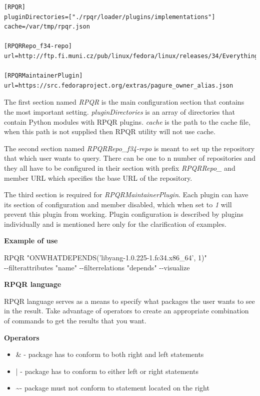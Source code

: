 \begin{lstlisting}
[RPQR]
pluginDirectories=["./rpqr/loader/plugins/implementations"]
cache=/var/tmp/rpqr.json

[RPQRRepo_f34-repo]
url=http://ftp.fi.muni.cz/pub/linux/fedora/linux/releases/34/Everything/x86_64/os/

[RPQRMaintainerPlugin]
url=https://src.fedoraproject.org/extras/pagure_owner_alias.json
\end{lstlisting}

The first section named \textit{RPQR} is the main configuration section that contains the most important
setting. \textit{pluginDirectories} is an array of directories that contain Python modules with RPQR
plugins. \textit{cache} is the path to the cache file, when this path is not supplied then RPQR utility
will not use cache.

The second section named \textit{RPQRRepo\_f34-repo} is meant to set up the repository that which user wants to
query. There can be one to n number of repositories and they all have to be configured in their 
section with prefix \textit{RPQRRepo\_} and member URL which specifies the base URL of the repository.

The third section is required for \textit{RPQRMaintainerPlugin}. Each plugin can have its section
of configuration and member disabled, which when set to \textit{1} will prevent this plugin from
working. Plugin configuration is described by plugins individually and is mentioned here only for
the clarification of examples.

\textbf{Example of use}

RPQR "ONWHATDEPENDS('libyang-1.0.225-1.fc34.x86\_64', 1)" \\ \linebreak -{}-filterattributes "name" -{}-filterrelations "depends" -{}-visualize

\textbf{RPQR language}

RPQR language serves as a means to specify what packages the user wants to see in the result. Take advantage
of operators to create an appropriate combination of commands to get the results that you want.

\newpage

\textbf{Operators}

\begin{itemize}
  \item \& - package has to conform to both right and left statements
  \item  | - package has to conform to either left or right statements
  \item  \textasciitilde\space - package must not conform to statement located on the right 
\end{itemize}

